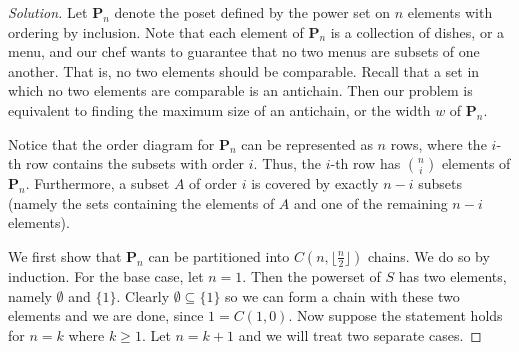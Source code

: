 \documentclass[12pt]{article}
\theoremstyle{definition}
\newenvironment{solution}{
  \begin{proof}[Solution]
    \vspace{-8px}
    \setlength{\parskip}{4px}
    \setlength{\parindent}{0px}
}{
\end{proof}
}
\begin{document}
  \begin{solution}
    Let \(\textbf{P}_{n}\) denote the poset defined by the power set on \(n\) elements with ordering by inclusion. Note that each element of \(\textbf{P}_{n}\) is a collection of dishes, or a menu, and our chef wants to guarantee that no two menus are subsets of one another. That is, no two elements should be comparable. Recall that a set in which no two elements are comparable is an antichain. Then our problem is equivalent to finding the maximum size of an antichain, or the width \(w\) of \(\textbf{P}_{n}\).

    Notice that the order diagram for \(\textbf{P}_{n}\) can be represented as \(n\) rows, where the \(i\)-th row contains the subsets with order \(i\). Thus, the \(i\)-th row has \({n \choose i}\) elements of \(\textbf{P}_{n}\). Furthermore, a subset \(A\) of order \(i\) is covered by exactly \(n - i\) subsets (namely the sets containing the elements of \(A\) and one of the remaining \(n - i\) elements).

    We first show that \(\textbf{P}_{n}\) can be partitioned into \(C\left(n, \lfloor{\frac{n}{2}}\rfloor\right)\) chains. We do so by induction. For the base case, let \(n = 1\). Then the powerset of \(S\) has two elements, namely \(\emptyset\) and \(\{1\}\). Clearly \(\emptyset \subseteq \{1\}\) so we can form a chain with these two elements and we are done, since \(1 = C\left(1, 0\right)\). Now suppose the statement holds for \(n = k\) where \(k \geq 1\). Let \(n = k+1\) and we will treat two separate cases.


\end{solution}
\end{document}
